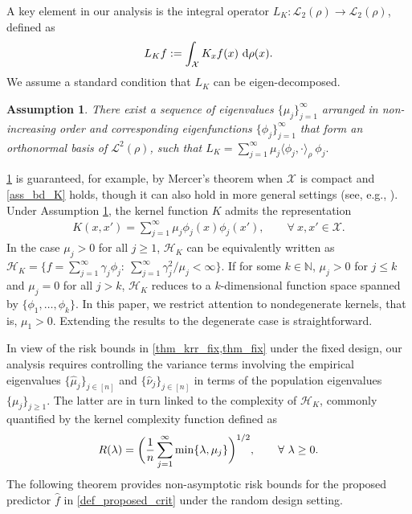 \documentclass[11pt,twoside]{article}
\newtheorem{assumption}{Assumption}
\def\NN{\mathbb{N}}
\def\cH{\mathcal H}
\def\cL{\mathcal L}
\def\cX{\mathcal{X}}
\def\wh{\widehat}
\def\i{\infty}
\def\d{~{\rm d}}
\begin{document}
A key element in our analysis is the integral operator  $L_K:  \cL_2(\rho) \to \cL_2(\rho)$, defined  as
\begin{align}\label{def_L_K}
    L_K f:=\int_{\cX} K_{x} f(x)\d\rho(x). 
\end{align}
We assume a standard condition that   $L_K$ can be eigen-decomposed.
\begin{assumption}\label{ass_mercer}
There exist a sequence of eigenvalues $\{\mu_j\}_{j=1}^\infty$ arranged in non-increasing order and corresponding eigenfunctions $\{\phi_j\}_{j=1}^\infty$ that form  an
orthonormal basis of $\cL^2(\rho)$, such that
$
L_{K}   =   \sum_{j=1}^\i \mu_{j}  \langle\phi_{j}, \cdot \rangle_\rho~  \phi_{j}. 
$
\end{assumption}
 \cref{ass_mercer} is guaranteed, for example, by Mercer's theorem \citep{mercer1909xvi} when $\cX$ is compact and \cref{ass_bd_K} holds, though it can also hold in more general settings (see, e.g., \citet{steinwart2012mercer}).  
 Under Assumption \ref{ass_mercer},  
the kernel function $K$ admits the representation
\begin{align}\label{eq_eigen_decomp}
K(x,x')=\sum_{j=1}^\infty\mu_j\phi_j(x)\phi_j(x'), \qquad  \forall ~ x,x'\in\cX. 
\end{align}
In the case $\mu_j>0$ for all $j\ge 1$, $\cH_K$ can be equivalently  written as 
$
\cH_K=  \{f=\sum_{j=1}^\infty\gamma_j\phi_j:
\ \sum_{j=1}^\infty {\gamma_j^2 }/{\mu_j}
<\infty  \}.
$
If for some $k\in \NN$, $\mu_j > 0$ for $j\le k$ and $\mu_j=0$ for all $j>k$, $\cH_K$ reduces to a $k$-dimensional function space spanned by  $\{\phi_1,\ldots, \phi_k\}$.  In this paper, we restrict attention to nondegenerate kernels, that is, $\mu_1>0$. Extending the results to the degenerate case is straightforward.

In view of the risk bounds in \cref{thm_krr_fix,thm_fix} under the fixed design, our analysis requires controlling the variance terms involving the empirical eigenvalues $\{\wh \mu_j\}_{j \in [n]}$ and $\{\wh \nu_j\}_{j \in [n]}$ in terms of the population eigenvalues $\{\mu_j\}_{j \ge 1}$. The latter are in turn linked to the complexity of $\cH_K$, commonly quantified by the kernel complexity function defined as
\begin{equation}\label{kernel_complexity}
      R(\lambda) = \biggl({1\over n}\sum_{j=1}^\i \min\{\lambda,\mu_j\}\biggr)^{1/2},\qquad \forall~  \lambda \ge 0.
\end{equation}
The following theorem provides non-asymptotic risk bounds for the proposed predictor $\wh f$ in \eqref{def_proposed_crit} under the random design setting.
  
\end{document}
